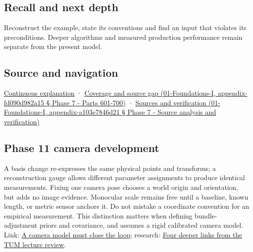 \subsection{Recall and next depth}\label{recall-and-next-depth}

Reconstruct the example, state its conventions and find an input that violates its preconditions. Deeper algorithms and measured production performance remain separate from the present model.

\subsection{Source and navigation}\label{source-and-navigation}

\href{Continuous\%20Notes/Computing\%20Foundations\%20-\%20From\%20Bits\%20to\%20C++\%20and\%20Systems\%20APIs\#Keep\%20the\%20promises\%20visible\%20while\%20moving\%20between\%20representations}{Continuous explanation} · \href{}{Coverage and source gap (01-Foundations-I, appendix-fd090d982a15 § Phase 7 - Parts 601-700)} · \href{}{Sources and verification (01-Foundations-I, appendix-a103e7846d21 § Phase 7 - Source analysis and verification)}

\subsection{Phase 11 camera development}\label{phase-11-camera-development}

A basis change re-expresses the same physical points and transforms; a reconstruction gauge allows different parameter assignments to produce identical measurements. Fixing one camera pose chooses a world origin and orientation, but adds no image evidence. Monocular scale remains free until a baseline, known length, or metric sensor anchors it. Do not mistake a coordinate convention for an empirical measurement. This distinction matters when defining bundle-adjustment priors and covariance, and assumes a rigid calibrated camera model. Link: \href{Continuous\%20Notes/Computing\%20Foundations\%20-\%20From\%20Bits\%20to\%20C++\%20and\%20Systems\%20APIs\#A\%20camera\%20model\%20must\%20close\%20the\%20loop}{A camera model must close the loop}; research: \href{Continuous\%20Notes/Computing\%20Foundations\%20-\%20From\%20Bits\%20to\%20C++\%20and\%20Systems\%20APIs\#Four\%20deeper\%20links\%20from\%20the\%20TUM\%20lecture\%20review}{Four deeper links from the TUM lecture review}.
